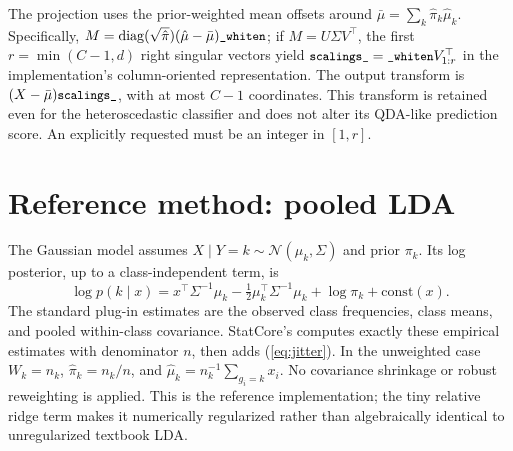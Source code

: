 \documentclass[conference]{IEEEtran}
\begin{document}
The projection uses the prior-weighted mean offsets around \(\bar\mu=\sum_k\hat\pi_k\hat\mu_k\). Specifically, \(M=\operatorname{diag}(\sqrt{\hat\pi})(\hat\mu-\bar\mu)\texttt{\small \_whiten}\); if \(M=U\Sigma V^\top\), the first \(r=\min(C-1,d)\) right singular vectors yield \(\texttt{\small scalings\_}=\texttt{\small \_whiten}V_{1:r}^\top\) in the implementation's column-oriented representation. The output transform is \((X-\bar\mu)\texttt{\small scalings\_}\), with at most \(C-1\) coordinates. This transform is retained even for the heteroscedastic classifier and does not alter its QDA-like prediction score. An explicitly requested  must be an integer in \([1,r]\).

\section{Reference method: pooled LDA}
The Gaussian model assumes \(X\mid Y=k\sim\mathcal N(\mu_k,\Sigma)\) and prior \(\pi_k\). Its log posterior, up to a class-independent term, is
\begin{equation}
\log p(k\mid x)=x^\top\Sigma^{-1}\mu_k-\tfrac12\mu_k^\top\Sigma^{-1}\mu_k+\log\pi_k+\mathrm{const}(x).
\end{equation}
The standard plug-in estimates are the observed class frequencies, class means, and pooled within-class covariance. StatCore's  computes exactly these empirical estimates with denominator \(n\), then adds (\ref{eq:jitter}). In the unweighted case \(W_k=n_k\), \(\hat\pi_k=n_k/n\), and \(\hat\mu_k=n_k^{-1}\sum_{g_i=k}x_i\). No covariance shrinkage or robust reweighting is applied. This is the reference implementation; the tiny relative ridge term makes it numerically regularized rather than algebraically identical to unregularized textbook LDA.
\end{document}
